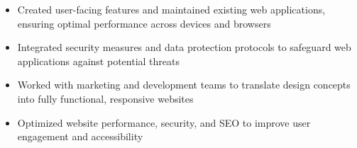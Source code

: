 \par\bigskip
{}
\par\smallskip
\begin{minipage}{13.75cm}
  \begin{minipage}{6.5cm}
    \begin{itemize}
      \item Created user-facing features and maintained existing web applications, ensuring optimal performance across devices and browsers
      \item Integrated security measures and data protection protocols to safeguard web applications against potential threats
    \end{itemize}
  \end{minipage}
  \hfill
  \begin{minipage}{6.5cm}
    \begin{itemize}
      \item Worked with marketing and development teams to translate design concepts into fully functional, responsive websites
      \item Optimized website performance, security, and SEO to improve user engagement and accessibility
    \end{itemize}
  \end{minipage}
\end{minipage}
\par\smallskip
\divider

